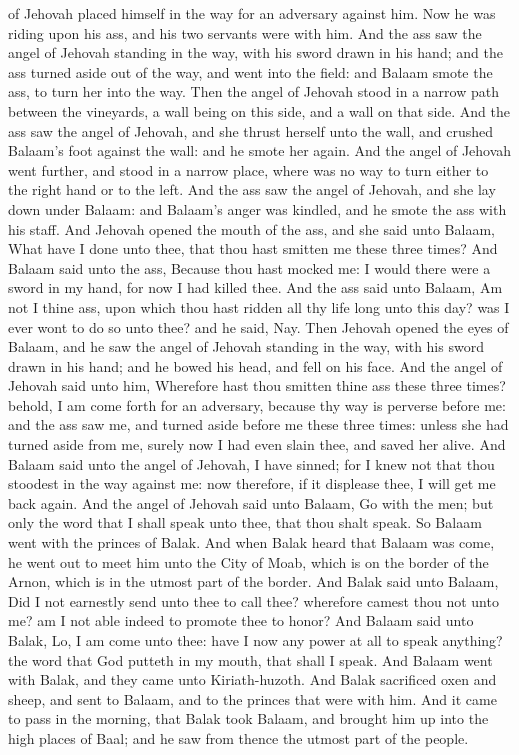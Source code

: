 of Jehovah placed himself in the way for an adversary against him. Now he was riding upon his ass, and his two servants were with him. And the ass saw the angel of Jehovah standing in the way, with his sword drawn in his hand; and the ass turned aside out of the way, and went into the field: and Balaam smote the ass, to turn her into the way. Then the angel of Jehovah stood in a narrow path between the vineyards, a wall being on this side, and a wall on that side. And the ass saw the angel of Jehovah, and she thrust herself unto the wall, and crushed Balaam’s foot against the wall: and he smote her again. And the angel of Jehovah went further, and stood in a narrow place, where was no way to turn either to the right hand or to the left. And the ass saw the angel of Jehovah, and she lay down under Balaam: and Balaam’s anger was kindled, and he smote the ass with his staff. And Jehovah opened the mouth of the ass, and she said unto Balaam, What have I done unto thee, that thou hast smitten me these three times? And Balaam said unto the ass, Because thou hast mocked me: I would there were a sword in my hand, for now I had killed thee. And the ass said unto Balaam, Am not I thine ass, upon which thou hast ridden all thy life long unto this day? was I ever wont to do so unto thee? and he said, Nay.  Then Jehovah opened the eyes of Balaam, and he saw the angel of Jehovah standing in the way, with his sword drawn in his hand; and he bowed his head, and fell on his face. And the angel of Jehovah said unto him, Wherefore hast thou smitten thine ass these three times? behold, I am come forth for an adversary, because thy way is perverse before me: and the ass saw me, and turned aside before me these three times: unless she had turned aside from me, surely now I had even slain thee, and saved her alive. And Balaam said unto the angel of Jehovah, I have sinned; for I knew not that thou stoodest in the way against me: now therefore, if it displease thee, I will get me back again. And the angel of Jehovah said unto Balaam, Go with the men; but only the word that I shall speak unto thee, that thou shalt speak. So Balaam went with the princes of Balak.  And when Balak heard that Balaam was come, he went out to meet him unto the City of Moab, which is on the border of the Arnon, which is in the utmost part of the border. And Balak said unto Balaam, Did I not earnestly send unto thee to call thee? wherefore camest thou not unto me? am I not able indeed to promote thee to honor? And Balaam said unto Balak, Lo, I am come unto thee: have I now any power at all to speak anything? the word that God putteth in my mouth, that shall I speak. And Balaam went with Balak, and they came unto Kiriath-huzoth. And Balak sacrificed oxen and sheep, and sent to Balaam, and to the princes that were with him.  And it came to pass in the morning, that Balak took Balaam, and brought him up into the high places of Baal; and he saw from thence the utmost part of the people. 

